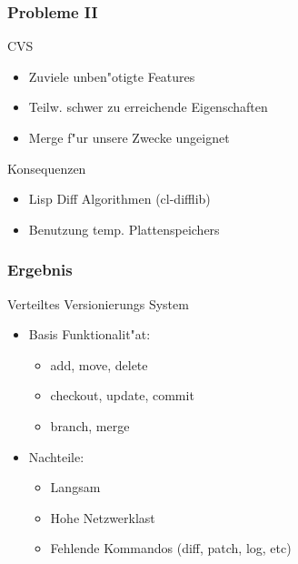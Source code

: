 \documentclass[german, presentation]{beamer}
\begin{document}
\begin{frame} \frametitle{Probleme II}
  \begin{block}{CVS}
    \begin{itemize}
    \item Zuviele unben"otigte Features
    \item Teilw. schwer zu erreichende Eigenschaften
    \item Merge f"ur unsere Zwecke ungeignet
    \end{itemize}
  \end{block}
  \begin{block}{Konsequenzen}
    \begin{itemize}
    \item Lisp Diff Algorithmen (cl-difflib)
    \item Benutzung temp. Plattenspeichers
    \end{itemize}
  \end{block}
\end{frame}

\begin{frame} \frametitle{Ergebnis}
  \begin{block}{Verteiltes Versionierungs System}
    \begin{itemize}
    \item Basis Funktionalit"at:
      \begin{itemize}
      \item add, move, delete
      \item checkout, update, commit
      \item branch, merge
      \end{itemize}
    \item Nachteile:
      \begin{itemize}
      \item Langsam
      \item Hohe Netzwerklast
      \item Fehlende Kommandos (diff, patch, log, etc)
      \end{itemize}
    \end{itemize}
  \end{block}
\end{frame}
\end{document}
